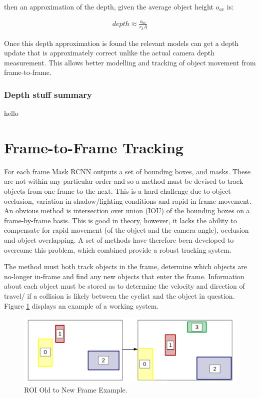 \documentclass[11pt,twoside]{report}
\begin{document}
then an approximation of the depth, given the average object height $o_{av}$ is:

\begin{equation}
\begin{aligned}
depth \approx \frac{o_{av}}{r_{3}A} 
\end{aligned}
\end{equation}

Once this depth approximation is found the relevant models can get a depth update that is approximately correct unlike the actual camera depth measurement. This allows better modelling and tracking of object movement from frame-to-frame.


\subsubsection{Depth stuff summary}

hello
\section{Frame-to-Frame Tracking}

For each frame Mask RCNN outputs a set of bounding boxes, and masks. These are not within any particular order and so a method must be devised to track objects from one frame to the next. This is a hard challenge due to object occlusion, variation in shadow/lighting conditions and rapid in-frame movement. An obvious method is intersection over union (IOU) of the bounding boxes on a frame-by-frame basis. This is good in theory, however, it lacks the ability to compensate for rapid movement (of the object and the camera angle), occlusion and object overlapping. A set of methods have therefore been developed to overcome this problem, which combined provide a robust tracking system.

The method must both track objects in the frame, determine which objects are no-longer in-frame and find any new objects that enter the frame. Information about each object must be stored as to determine the velocity and direction of travel/ if a collision is likely between the cyclist and the object in question. Figure \ref{roi_match} displays an example of a working system.

\noindent \begin{figure}[h!]
	\includegraphics[width = 1.0\hsize]{figures/roi_match.png}
	\caption{ROI Old to New Frame Example.}
	\label{roi_match}
\end{figure}
\end{document}

